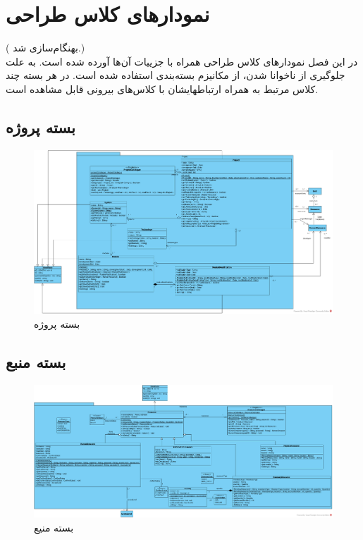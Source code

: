 \chapter{نمودارهای کلاس طراحی}
({\color{red} بهنگام‌سازی شد.}) \\
در این فصل نمودارهای کلاس طراحی همراه با جزییات آن‌ها آورده شده است. به علت جلوگیری از ناخوانا شدن، از مکانیزم بسته‌بندی
استفاده شده است. در هر بسته چند کلاس مرتبط به همراه ارتباطهایشان با کلاس‌های بیرونی قابل مشاهده است.
\begin{landscape}
\section{بسته پروژه}
\begin{figure}[H]
	\centering
	\includegraphics[scale=0.35]{img/class-design/ProjectPackage}
	\caption{بسته پروژه}
\end{figure}



\section{بسته منبع}
\begin{figure}[H]
	\centering
	\includegraphics[scale=0.35]{img/class-design/ResourcePackage}
	\caption{بسته منیع}
\end{figure}



\end{landscape}
